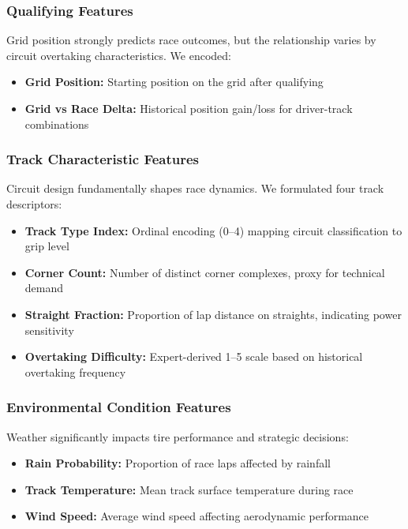\documentclass[conference]{IEEEtran}
\begin{document}
\subsubsection{Qualifying Features}

Grid position strongly predicts race outcomes, but the relationship varies by circuit overtaking characteristics. We encoded:

\begin{itemize}
    \item \textbf{Grid Position:} Starting position on the grid after qualifying
    \item \textbf{Grid vs Race Delta:} Historical position gain/loss for driver-track combinations
\end{itemize}

\subsubsection{Track Characteristic Features}

Circuit design fundamentally shapes race dynamics. We formulated four track descriptors:

\begin{itemize}
    \item \textbf{Track Type Index:} Ordinal encoding (0--4) mapping circuit classification to grip level
    \item \textbf{Corner Count:} Number of distinct corner complexes, proxy for technical demand
    \item \textbf{Straight Fraction:} Proportion of lap distance on straights, indicating power sensitivity
    \item \textbf{Overtaking Difficulty:} Expert-derived 1--5 scale based on historical overtaking frequency
\end{itemize}

\subsubsection{Environmental Condition Features}

Weather significantly impacts tire performance and strategic decisions:

\begin{itemize}
    \item \textbf{Rain Probability:} Proportion of race laps affected by rainfall
    \item \textbf{Track Temperature:} Mean track surface temperature during race
    \item \textbf{Wind Speed:} Average wind speed affecting aerodynamic performance
\end{itemize}
\end{document}
